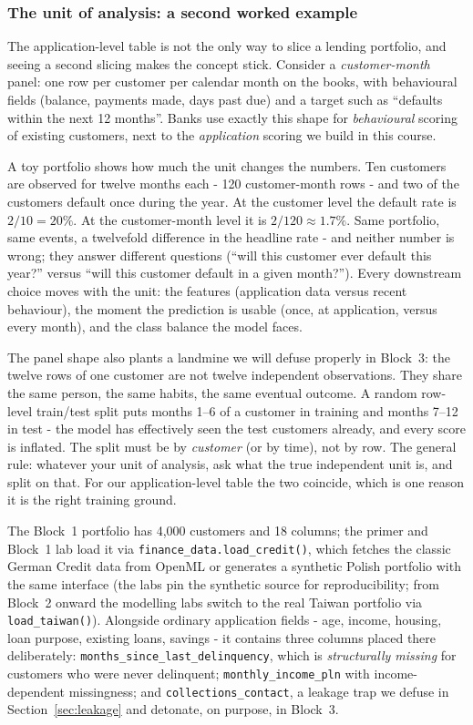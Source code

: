 \documentclass[11pt,a4paper]{article}
\begin{document}
\subsubsection{The unit of analysis: a second worked example}
The application-level table is not the only way to slice a lending
portfolio, and seeing a second slicing makes the concept stick. Consider a
\emph{customer-month} panel: one row per customer per calendar month on the
books, with behavioural fields (balance, payments made, days past due) and
a target such as ``defaults within the next 12 months''. Banks use exactly
this shape for \emph{behavioural} scoring of existing customers, next to
the \emph{application} scoring we build in this course.

A toy portfolio shows how much the unit changes the numbers. Ten customers
are observed for twelve months each - 120 customer-month rows - and two
of the customers default once during the year. At the customer level the
default rate is $2/10 = 20\%$. At the customer-month level it is
$2/120 \approx 1.7\%$. Same portfolio, same events, a twelvefold difference in
the headline rate - and neither number is wrong; they answer different
questions (``will this customer ever default this year?'' versus ``will
this customer default in a given month?''). Every downstream choice moves
with the unit: the features (application data versus recent behaviour),
the moment the prediction is usable (once, at application, versus every
month), and the class balance the model faces.

The panel shape also plants a landmine we will defuse properly in Block~3:
the twelve rows of one customer are not twelve independent observations.
They share the same person, the same habits, the same eventual outcome. A
random row-level train/test split puts months 1--6 of a customer in
training and months 7--12 in test - the model has effectively seen the
test customers already, and every score is inflated. The split must be by
\emph{customer} (or by time), not by row. The general rule: whatever your
unit of analysis, ask what the true independent unit is, and split on
that. For our application-level table the two coincide, which is one
reason it is the right training ground.

The Block~1 portfolio has 4{,}000 customers and 18 columns; the primer and
Block~1 lab load it via \texttt{finance\_data.load\_credit()}, which fetches
the classic German Credit data from OpenML or generates a synthetic Polish
portfolio with the same interface (the labs pin the synthetic source for
reproducibility; from Block~2 onward the modelling labs switch to the real
Taiwan portfolio via \texttt{load\_taiwan()}). Alongside ordinary application fields - age, income,
housing, loan purpose, existing loans, savings - it contains three columns
placed there deliberately: \texttt{months\_since\_last\_delinquency}, which
is \emph{structurally missing} for customers who were never delinquent;
\texttt{monthly\_income\_pln} with income-dependent missingness; and
\texttt{collections\_contact}, a leakage trap we defuse in
Section~\ref{sec:leakage} and detonate, on purpose, in Block~3.
\end{document}
